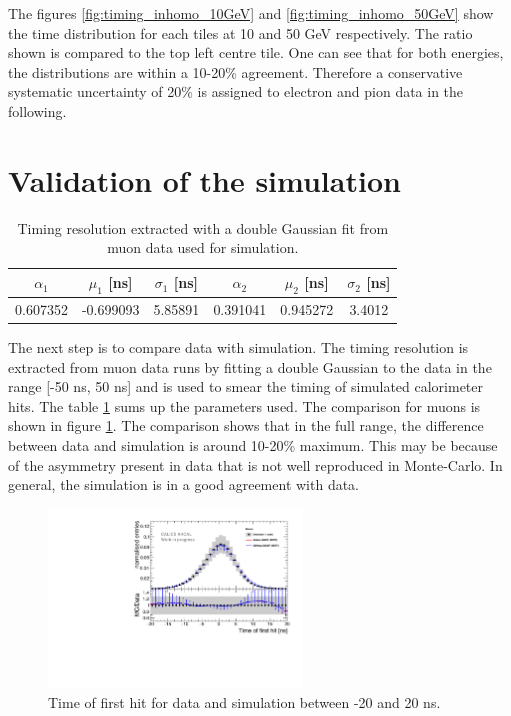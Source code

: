 The figures \ref{fig:timing_inhomo_10GeV} and \ref{fig:timing_inhomo_50GeV} show the time distribution for each tiles at 10 and 50 GeV respectively. The ratio shown is compared to the top left centre tile. One can see that for both energies, the distributions are within a 10-20\% agreement. Therefore a conservative systematic uncertainty of 20\% is assigned to electron and pion data in the following.

\section{Validation of the simulation}

\begin{table}[htb!]
	\centering
	\caption{Timing resolution extracted with a double Gaussian fit from muon data used for simulation.}
	\label{table:time_res_sim}
	\begin{tabular}{@{} cccccc @{}}
		\hline
		$\alpha_{1}$ & $\mu_{1}$ [ns] & $\sigma_{1}$ [ns] & $\alpha_{2}$ & $\mu_{2}$ [ns] & $\sigma_{2}$ [ns] \\
		\hline
		0.607352 & -0.699093 & 5.85891 & 0.391041 & 0.945272 & 3.4012 \\
		\hline
	\end{tabular}
\end{table}

The next step is to compare data with simulation. The timing resolution is extracted from muon data runs by fitting a double Gaussian to the data in the range [-50 ns, 50 ns] and is used to smear the timing of simulated calorimeter hits. The table \ref{table:time_res_sim} sums up the parameters used. The comparison for muons is shown in figure \ref{fig:sim_data_muon}. The comparison shows that in the full range, the difference between data and simulation is around 10-20\% maximum. This may be because of the asymmetry present in data that is not well reproduced in Monte-Carlo. In general, the simulation is in a good agreement with data.

\begin{figure}[htbp!]
	\centering
	\includegraphics[width=0.6\textwidth]{chap5/fig_AHCAL_timing/Muons/Comparison_MokkaDD4hepData_Muons.pdf}
	\caption{Time of first hit for data and simulation between -20 and 20 ns.}
	\label{fig:sim_data_muon}
\end{figure}

